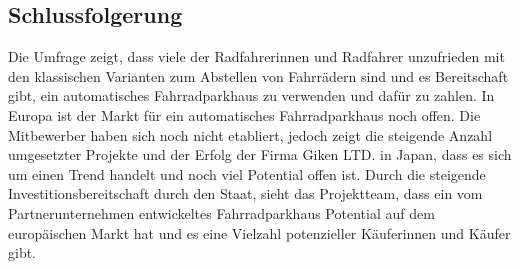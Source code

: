 \subsection{Schlussfolgerung}

Die Umfrage zeigt, dass viele der Radfahrerinnen und Radfahrer unzufrieden mit den klassischen Varianten zum Abstellen von Fahrrädern sind und es Bereitschaft gibt, ein automatisches Fahrradparkhaus zu verwenden und dafür zu zahlen.
\noindent In Europa ist der Markt für ein automatisches Fahrradparkhaus noch offen. Die Mitbewerber haben sich noch nicht etabliert, jedoch zeigt die steigende Anzahl umgesetzter Projekte und der Erfolg der Firma Giken LTD. in Japan, dass es sich um einen Trend handelt und noch viel Potential offen ist.
\noindent Durch die steigende Investitionsbereitschaft durch den Staat, sieht das Projektteam, dass ein vom Partnerunternehmen entwickeltes Fahrradparkhaus Potential auf dem europäischen Markt hat und es eine Vielzahl potenzieller Käuferinnen und Käufer gibt.
